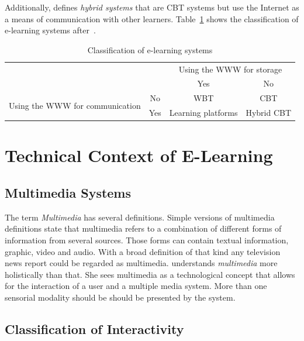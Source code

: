 Additionally,  \citeyear{Richert2007} defines
\emph{hybrid systems} that are CBT systems but use the Internet as a means of
communication with other learners.
Table~\ref{table:elearningsystems} shows the classification of e-learning systems
after~.
\begin{table}[htbp]
\begin{tabular}{|c|c|c|c|}
  \hline
  \multicolumn{2}{|c|}{} & \multicolumn{2}{|c|}{Using the WWW for storage} \\
  \cline{3-4}
  \multicolumn{2}{|c|}{} & Yes & No \\
  \hline
  \multirow{2}{*}{Using the WWW for communication} & No & WBT & CBT \\
  \cline{2-4}
   & Yes & Learning platforms & Hybrid CBT \\
  \hline
\end{tabular}
\caption{Classification of e-learning systems}
\label{table:elearningsystems}
\end{table}

\section{Technical Context of E-Learning}
\label{sec:elearn:technicalcontext}

\subsection{Multimedia Systems}
\label{sec:elearn:multimediasystems}

The term \emph{Multimedia} has several definitions. Simple versions of 
multimedia definitions state that multimedia refers to a combination of
different forms of information from several sources. Those forms can contain
textual information, graphic, video and audio. With a broad definition
of that kind any television news report could be regarded as multimedia.
 \citeyear{Richert2007} understands \emph{multimedia}
more holistically than that. She sees multimedia as a technological concept 
that allows for the interaction of a user and a multiple media system.
More than one sensorial modality should be should be presented by the system.

\subsection{Classification of Interactivity}
\label{sec:elearn:interactivity}

